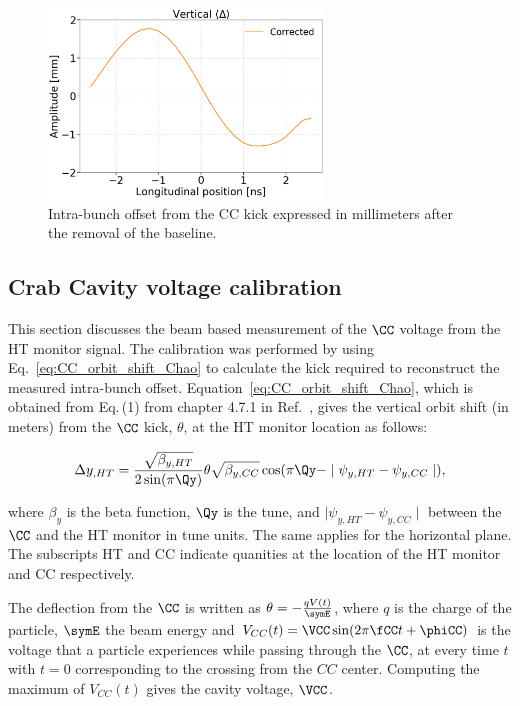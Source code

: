 \begin{figure}[!h]
   \centering         
   \includegraphics[width=0.65\textwidth]{images/Ch4/HT_corrected__20180530_135105_baseline_correction_new_version.png}
       \caption{Intra-bunch offset from the CC kick expressed in millimeters after the removal of the baseline.}
       \label{fig:HT_baseline_correction_crabbing_mm}
\end{figure}


 \subsection{Crab Cavity voltage calibration}\label{sec:Vcc_calibration}
 This section discusses the beam based measurement of the $\CC$ voltage from the HT monitor signal. The calibration was performed by using Eq.~\eqref{eq:CC_orbit_shift_Chao} to calculate the kick required to reconstruct the measured intra-bunch offset. Equation~\eqref{eq:CC_orbit_shift_Chao}, which is obtained from Eq.\,(1) from chapter 4.7.1 in Ref.~\cite{Chao:1490001}, gives the vertical orbit shift (in meters) from the $\CC$ kick, $\theta$, at the HT monitor location as follows:


\begin{equation}\label{eq:CC_orbit_shift_Chao}
   \Delta y_{,HT} = \frac{\sqrt{\beta_{y, HT}}}{2 \sin(\pi \Qy)} \theta \sqrt{\beta_{y, CC}} \cos(\pi \Qy - \mid \psi_{y, HT} - \psi_{y, CC} \mid),
\end{equation}

where $\beta_y$ is the beta function, $\Qy$ is the tune, and $\mid \psi_{y, HT} - \psi_{y, CC} \mid$ between the $\CC$ and the HT monitor in tune units. The same applies for the horizontal plane. The subscripts HT and CC indicate quanities at the location of the HT monitor and CC respectively.

The deflection from the $\CC$ is written as $\theta = - \frac{q V(t)}{\symE}$, where $q$ is the charge of the particle, $\symE$ the beam energy and $V_{CC}(t) = \VCC \sin(2 \pi \fCC t + \phiCC) $ is the voltage that a particle experiences while passing through the $\CC$, at every time $t$ with $t=0$ corresponding to the crossing from the $CC$ center. Computing the maximum of $V_{CC}(t)$ gives the cavity voltage, $\VCC$. 

